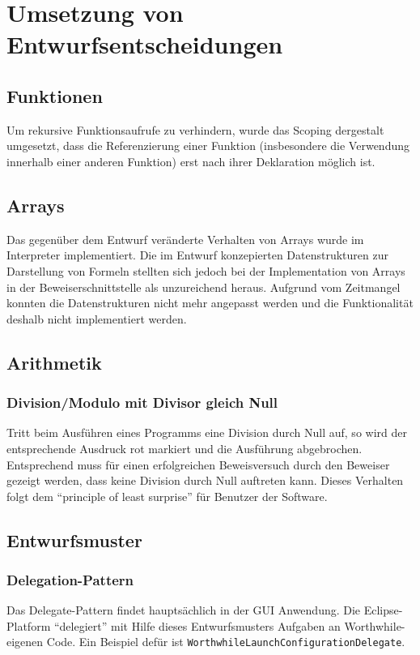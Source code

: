 \section{Umsetzung von Entwurfsentscheidungen}
\subsection{Funktionen}
Um rekursive Funktionsaufrufe zu verhindern, wurde das Scoping dergestalt umgesetzt, dass die Referenzierung einer Funktion (insbesondere die Verwendung innerhalb einer anderen Funktion) erst nach ihrer Deklaration möglich ist.

\subsection{Arrays}
Das gegenüber dem Entwurf veränderte Verhalten von Arrays wurde im Interpreter implementiert. Die im Entwurf konzepierten Datenstrukturen zur Darstellung von Formeln stellten sich jedoch bei der Implementation von Arrays in der Beweiserschnittstelle als unzureichend heraus. Aufgrund vom Zeitmangel konnten die Datenstrukturen nicht mehr angepasst werden und die Funktionalität deshalb nicht implementiert werden.

\subsection{Arithmetik}
\subsubsection{Division/Modulo mit Divisor gleich Null \label{umsetzung_division_null}}
Tritt beim Ausführen eines Programms eine Division durch Null auf, so wird der entsprechende Ausdruck rot markiert und die Ausführung abgebrochen. Entsprechend muss für einen erfolgreichen Beweisversuch durch den Beweiser gezeigt werden, dass keine Division durch Null auftreten kann. Dieses Verhalten folgt dem "`principle of least surprise"' für Benutzer der Software.

\subsection{Entwurfsmuster}
\subsubsection{Delegation-Pattern}
Das Delegate-Pattern findet hauptsächlich in der GUI Anwendung. Die Eclipse-Platform "`delegiert"' mit Hilfe dieses Entwurfsmusters Aufgaben an Worthwhile-eigenen Code. Ein Beispiel defür ist \texttt{WorthwhileLaunchConfigurationDelegate}.

